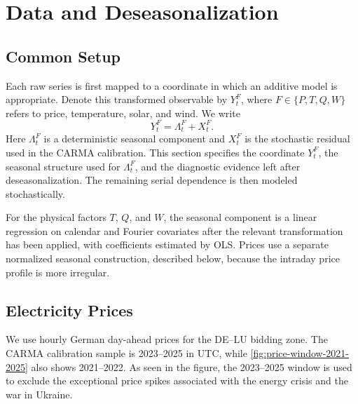 \section{Data and Deseasonalization}\label{sec:deseasonalization}

\subsection{Common Setup}\label{ssec:deseasonalization-common}

Each raw series is first mapped to a coordinate in which an additive model is
appropriate. Denote this transformed observable by \(Y^F_t\), where
\(F\in\{P,T,Q,W\}\) refers to price, temperature, solar, and wind. We write
\begin{equation}
  Y^F_t=\Lambda^F_t+X^F_t .
  \label{eq:deseasonalization-common-decomposition}
\end{equation}
Here \(\Lambda^F_t\) is a deterministic seasonal component and \(X^F_t\) is the
stochastic residual used in the CARMA calibration. This section specifies the
coordinate \(Y^F_t\), the seasonal structure used for \(\Lambda^F_t\), and the
diagnostic evidence left after deseasonalization. The remaining serial
dependence is then modeled stochastically.

For the physical factors \(T\), \(Q\), and \(W\), the seasonal component is a
linear regression on calendar and Fourier covariates after the relevant
transformation has been applied, with coefficients estimated by OLS. Prices use
a separate normalized seasonal construction, described below, because the
intraday price profile is more irregular.

\subsection{Electricity Prices}\label{ssec:price-deseasonalization}

We use hourly German day-ahead prices for the DE--LU bidding zone. The CARMA
calibration sample is 2023--2025 in UTC, while
\cref{fig:price-window-2021-2025} also shows 2021--2022. As seen in the figure,
the 2023--2025 window is used to exclude the exceptional price spikes associated
with the energy crisis and the war in Ukraine.

